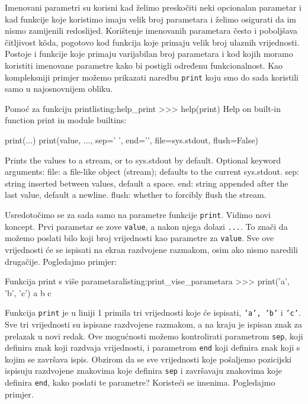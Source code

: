 Imenovani parametri su korisni kad želimo preskočiti neki opcionalan parametar i kad funkcije koje koristimo imaju velik broj parametara i želimo osigurati da im nismo zamijenili redoslijed. Korištenje imenovanih parametara često i poboljšava čitljivost kôda, pogotovo kod funkcija koje primaju velik broj ulaznih vrijednosti. Postoje i funkcije koje primaju varijabilan broj parametara i kod kojih moramo koristiti imenovane parametre kako bi postigli određenu funkcionalnost. Kao kompleksniji primjer možemo prikazati naredbu \texttt{print} koju smo do sada koristili samo u najosnovnijem obliku.

\begin{python}{Pomoć za funkciju print}{listing:help_print}
>>> help(print)
Help on built-in function print in module builtins:

print(...)
    print(value, ..., sep=' ', end='\n', file=sys.stdout, flush=False)

    Prints the values to a stream, or to sys.stdout by default.
    Optional keyword arguments:
    file:  a file-like object (stream); defaults to the current sys.stdout.
    sep:   string inserted between values, default a space.
    end:   string appended after the last value, default a newline.
    flush: whether to forcibly flush the stream.
\end{python}

Usredotočimo se za sada samo na parametre funkcije \texttt{print}. Vidimo novi koncept. Prvi parametar se zove \texttt{value}, a nakon njega dolazi \texttt{...}. To znači da možemo poslati bilo koji broj vrijednosti kao parametre za \texttt{value}. Sve ove vrijednosti će se ispisati na ekran razdvojene razmakom, osim ako nismo naredili drugačije. Pogledajmo primjer:

\begin{python}{Funkcija print s više parametara}{listing:print_vise_parametara}
>>> print('a', 'b', 'c')
a b c
\end{python}

Funkcija \texttt{print} je u liniji 1 primila tri vrijednosti koje će ispisati, \texttt{'a', 'b'} i \texttt{'c'}. Sve tri vrijednosti su ispisane razdvojene razmakom, a na kraju je ispisan znak za prelazak u novi redak. Ove mogućnosti možemo kontrolirati parametrom \texttt{sep}, koji definira znak koji razdvaja vrijednosti, i parametrom \texttt{end} koji definira znak koji s kojim se završava ispis. Obzirom da se sve vrijednosti koje pošaljemo pozicijski ispisuju razdvojene znakovima koje definira \texttt{sep} i završavaju znakovima koje definira \texttt{end}, kako poslati te parametre? Koristeći se imenima. Pogledajmo primjer.

